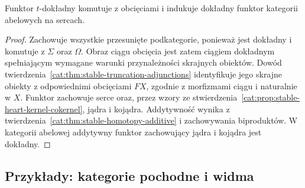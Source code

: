\begin{wniosek}\label{cat:cor:stable-t-exact-heart}
Funktor $t$-dokładny komutuje z obcięciami i indukuje dokładny funktor kategorii abelowych na sercach.
\end{wniosek}
\begin{proof}
Zachowuje wszystkie przesunięte podkategorie, ponieważ jest dokładny i komutuje z $\Sigma$ oraz $\Omega$. Obraz ciągu obcięcia jest zatem ciągiem dokładnym spełniającym wymagane warunki przynależności skrajnych obiektów. Dowód twierdzenia~\ref{cat:thm:stable-truncation-adjunctions} identyfikuje jego skrajne obiekty z odpowiednimi obcięciami $FX$, zgodnie z morfizmami ciągu i naturalnie w $X$. Funktor zachowuje serce oraz, przez wzory ze stwierdzenia~\ref{cat:prop:stable-heart-kernel-cokernel}, jądra i kojądra. Addytywność wynika z twierdzenia~\ref{cat:thm:stable-homotopy-additive} i zachowywania biproduktów. W kategorii abelowej addytywny funktor zachowujący jądra i kojądra jest dokładny.
\end{proof}

\subsection{Przykłady: kategorie pochodne i widma}

